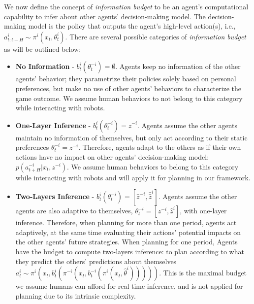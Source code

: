 \documentclass[letterpaper, 10 pt, conference]{ieeeconf}  %
\begin{document}
We now define the concept of \textit{information budget} to be an agent's computational capability to infer about other agents' decision-making model. The decision-making model is the policy that outputs the agent's high-level action(s), i.e., $a^i_{t:t+H} \sim \pi^i(x_t,\theta^i_t)$. There are several possible categories of \textit{information budget} as will be outlined below:

\begin{itemize}
	\item \textbf{No Information} - $b^i_t(\theta^{-i}_t) = \emptyset$. Agents keep no information of the other agents' behavior; they parametrize their policies solely based on personal preferences, but make no use of other agents' behaviors to characterize the game outcome. We assume human behaviors to not belong to this category while interacting with robots.
	\item \textbf{One-Layer Inference} - $b^i_t(\theta^{-i}_t) = \hat{z}^{-i}$. Agents assume the other agents maintain no information of themselves, but only act according to their static preferences $\theta^{-i}_t = z^{-i}$. Therefore, agents adapt to the others as if their own actions have no impact on other agents' decision-making model: $p(a^{-i}_{t+H}|x_t, z^{-i})$. We assume human behaviors to belong to this category while interacting with robots and will apply it for planning in our framework.
	\item \textbf{Two-Layers Inference} - $b^i_t(\theta^{-i}_t) = [\hat{z}^{-i}, \hat{\hat{z}}^i]$. Agents assume the other agents are also adaptive to themselves,
	$\theta^{-i}_t = [z^{-i}, \hat{z}^{i}]$, with one-layer inference. Therefore, when planning for more than one period, agents act adaptively, at the same time evaluating their actions' potential impacts on the other agents' future strategies. When planning for one period, Agents have the budget to compute two-layers inference: to plan according to what they predict the others' predictions about themselves $a^i_t \sim \pi^i(x_t, b^i_t(\pi^{-i}(x_t,b^{-i}_t(\pi^i(x_t,\hat{\theta}^i)))))$. This is the maximal budget we assume humans can afford for real-time inference, and is not applied for planning due to its intrinsic complexity. 
\end{itemize}
\end{document}
